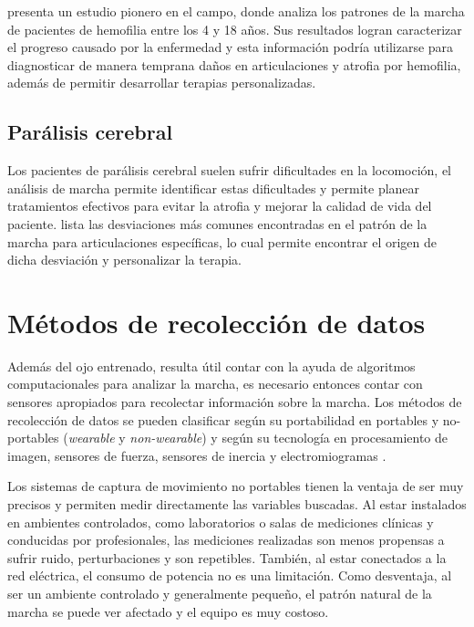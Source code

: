 \cite{forneris} presenta un estudio pionero en el campo, donde analiza los patrones de la marcha de pacientes de hemofilia entre los 4 y 18 años. Sus resultados logran caracterizar el progreso causado por la enfermedad y esta información podría utilizarse para diagnosticar de manera temprana daños en articulaciones y atrofia por hemofilia, además de permitir desarrollar terapias personalizadas. 

\subsection{Parálisis cerebral}

Los pacientes de parálisis cerebral suelen sufrir dificultades en la locomoción, el análisis de marcha permite identificar estas dificultades y permite planear tratamientos efectivos para evitar la atrofia y mejorar la calidad de vida del paciente. \cite{sangeux} lista las desviaciones más comunes encontradas en el patrón de la marcha para articulaciones específicas, lo cual permite encontrar el origen de dicha desviación y personalizar la terapia.


\section[Métodos de recolección]{Métodos de recolección de datos}

Además del ojo entrenado, resulta útil contar con la ayuda de algoritmos computacionales para analizar la marcha, es necesario entonces contar con sensores apropiados para recolectar información sobre la marcha. Los métodos de recolección de datos se pueden clasificar según su portabilidad en portables y no-portables (\emph{wearable} y \emph{non-wearable}) y según su tecnología en procesamiento de imagen, sensores de fuerza, sensores de inercia y electromiogramas \citep{muro}.

Los sistemas de captura de movimiento no portables tienen la ventaja de ser muy precisos y permiten medir directamente las variables buscadas. Al estar instalados en ambientes controlados, como laboratorios o salas de mediciones clínicas y conducidas por profesionales, las mediciones realizadas son menos propensas a sufrir ruido, perturbaciones y son repetibles. También, al estar conectados a la red eléctrica, el consumo de potencia no es una limitación. Como desventaja, al ser un ambiente controlado y generalmente pequeño, el patrón natural de la marcha se puede ver afectado y el equipo es muy costoso. \citep{muro}

